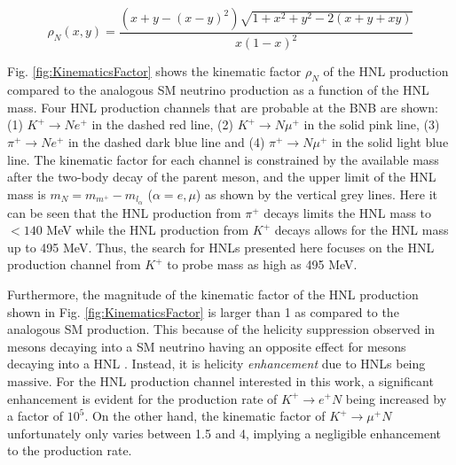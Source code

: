 \begin{equation}
	\rho_{N}(x,y) = \frac{(x+y-(x-y)^{2})\sqrt{1+x^{2}+y^{2}-2(x+y+xy)}}{x(1-x)^{2}}
\label{eq:KinematicsFactor}
\end{equation}

Fig. \ref{fig:KinematicsFactor} shows the kinematic factor $\rho_N$ of the HNL production compared to the analogous SM neutrino production as a function of the HNL mass.
Four HNL production channels that are probable at the BNB are shown: (1) $K^+ \rightarrow Ne^+$ in the dashed red line, (2) $K^+ \rightarrow N\mu^+$ in the solid pink line, (3) $\pi^+ \rightarrow Ne^+$ in the dashed dark blue line and (4) $\pi^+ \rightarrow N\mu^+$ in the solid light blue line.  
The kinematic factor for each channel is constrained by the available mass after the two-body decay of the parent meson, and the upper limit of the HNL mass is $m_{N} = m_{m^+} - m_{l_{\alpha}}$ ($\alpha=e,\mu$) as shown by the vertical grey lines.
Here it can be seen that the HNL production from $\pi^+$ decays limits the HNL mass to $< 140$ MeV while the HNL production from $K^+$ decays allows for the HNL mass up to 495 MeV. 
Thus, the search for HNLs presented here focuses on the HNL production channel from $K^+$ to probe mass as high as 495 MeV.




Furthermore, the magnitude of the kinematic factor of the HNL production shown in Fig. \ref{fig:KinematicsFactor} is larger than 1 as compared to the analogous SM production.
This because of the helicity suppression observed in mesons decaying into a SM neutrino having an opposite effect for mesons decaying into a HNL \cite{HNLKelly}.
Instead, it is helicity \textit{enhancement} due to HNLs being massive.
For the HNL production channel interested in this work, a significant enhancement is evident for the production rate of $K^+\rightarrow e^+ N$ being increased by a factor of $10^{5}$.
On the other hand, the kinematic factor of $K^+ \rightarrow \mu^+ N$ unfortunately only varies between 1.5 and 4, implying a negligible enhancement to the production rate. 


